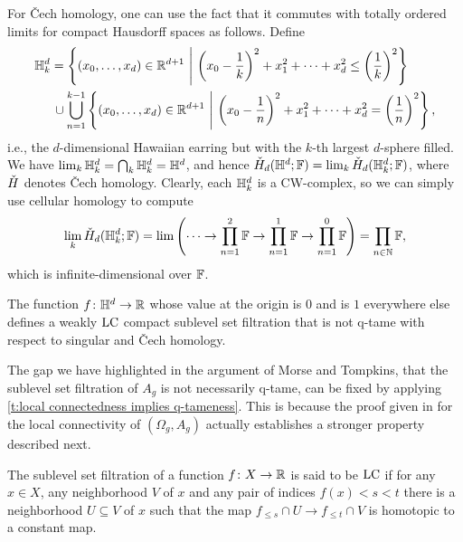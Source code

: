 For \v{C}ech homology, one can use the fact that it commutes with totally ordered limits for compact Hausdorff spaces \cite[Theorems VIII.3.6.\@ and X.3.1.]{Eilenberg.1952} as follows.
Define 
\begin{align*}
\HE_k &=
\left\{ (x_0, \dots, x_d) \in \R^{d+1} \ \middle| \ \left( x_0 - \frac{1}{k} \right)^2 + x_1^2 + \dots + x_d^2 \leq \left( \frac{1}{k} \right)^2 \right\} \\ &\, \cup
\bigcup_{n=1}^{k-1} \left\{ (x_0, \dots, x_d) \in \R^{d+1} \ \middle |\ \left( x_0 - \frac{1}{n} \right)^2 + x_1^2 + \dots + x_d^2 = \left( \frac{1}{n} \right)^2 \right\},
\end{align*}
i.e., the $d$-dimensional Hawaiian earring but with the $k$-th largest $d$-sphere filled.
We have $\lim_{k} \mathbb{H}^d_{k} = \bigcap_{k} \mathbb{H}^d_{k} = \mathbb{H}^d$, and hence $\check{H}_{d}(\mathbb{H}^d; \mathbb{F}) = \lim_{k} \check{H}_{d}(\mathbb{H}^d_{k}; \mathbb{F})$, where $\check{H}$ denotes \v{C}ech homology.
Clearly, each $\mathbb{H}^d_{k}$ is a CW-complex, so we can simply use cellular homology to compute
\begin{equation*}
\lim_{k}\check{H}_{d}(\mathbb{H}^{d}_{k}; \mathbb{F})=\lim\left(\dots\to \prod_{n=1}^2\mathbb{F}\to \prod_{n=1}^1\mathbb{F}\to \prod_{n=1}^0\mathbb{F}\right)=\prod_{n\in\mathbb{N}}\mathbb{F},
\end{equation*}
which is infinite-dimensional over $\mathbb{F}$.

\begin{cor} \label{c:counterexample}
	The function $f \colon \mathbb{H}^d \to \mathbb{R}$ whose value at the origin is $0$ and is $1$ everywhere else defines a weakly $\mathrm{LC}$ compact sublevel set filtration that is not q-tame with respect to singular and \v{C}ech homology.
\end{cor}

The gap we have highlighted in the argument of Morse and Tompkins, that the sublevel set filtration of $A_g$ is not necessarily q-tame, can be fixed by applying \cref{t:local connectedness implies q-tameness}.
This is because the proof given in \cite[p.464]{Morse.1939} for the local connectivity of $(\Omega_g, A_g)$ actually establishes a stronger property described next.

\begin{defi}
	The sublevel set filtration of a function $f \colon X \to \mathbb{R}$ is said to be $\mathrm{LC}$ if for any $x \in X$, any neighborhood $V$ of $x$ and any pair of indices $f(x) < s < t$ there is a neighborhood $U \subseteq V$ of $x$ such that the map $f_{\leq s} \cap U \to f_{\leq t} \cap V$ is homotopic to a constant map.
\end{defi}

